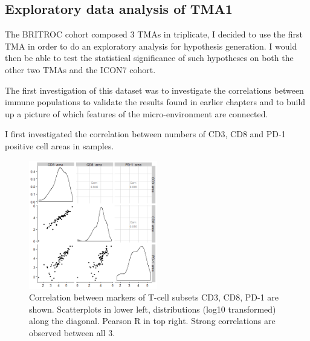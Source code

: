 \subsection{Exploratory data analysis of TMA1}

The BRITROC cohort composed 3 TMAs in triplicate, I decided to use the first TMA in order to do an exploratory analysis for hypothesis generation. I would then be able to test the statistical significance of such hypotheses on both the other two TMAs and the ICON7 cohort. 

The first investigation of this dataset was to investigate the correlations between immune populations to validate the results found in earlier chapters and to build up a picture of which features of the micro-environment are connected.

I first investigated the correlation between numbers of CD3, CD8 and PD-1 positive cell areas in samples.

\begin{figure}
    \centering
    \includegraphics[width=0.5\textwidth]{Chapter4/figs/BRITROC_CD3_CD8_PD-1_corr.png}
    \caption[Correlation between markers of T-cell subsets CD3, CD8, PD-1]{Correlation between markers of T-cell subsets CD3, CD8, PD-1 are shown. Scatterplots in lower left, distributions (log10 transformed) along the diagonal. Pearson R in top right. Strong correlations are observed between all 3.}
    \label{fig:CD8_CD3_PD1}
\end{figure}

